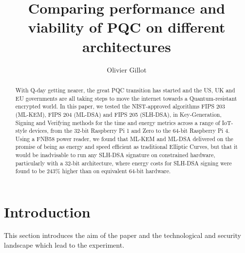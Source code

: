 \documentclass[11pt, letterpaper]{article}
\title{Comparing performance and viability of PQC on different architectures}
\author{Olivier Gillot}
\begin{document}
\maketitle

\begin{abstract}
With Q-day getting nearer, the great PQC transition has started and the US, UK and EU governments are all taking steps to move the internet towards a Quantum-resistant encrypted world. In this paper, we tested the NIST-approved algorithms FIPS 203 (ML-KEM), FIPS 204 (ML-DSA) and FIPS 205 (SLH-DSA), in Key-Generation, Signing and Verifying methods for the time and energy metrics across a range of IoT-style devices, from the 32-bit Raspberry Pi 1 and Zero to the 64-bit Raspberry Pi 4. Using a FNB58 power reader, we found that ML-KEM and ML-DSA delivered on the promise of being as energy and speed efficient as traditional Elliptic Curves, but that it would be inadvisable to run any SLH-DSA signature on constrained hardware, particularly with a 32-bit architecture, where energy costs for SLH-DSA signing were found to be 243\% higher than on equivalent 64-bit hardware.
\end{abstract}

\section{Introduction}

This section introduces the aim of the paper and the technological and security landscape which lead to the experiment.
\end{document}
